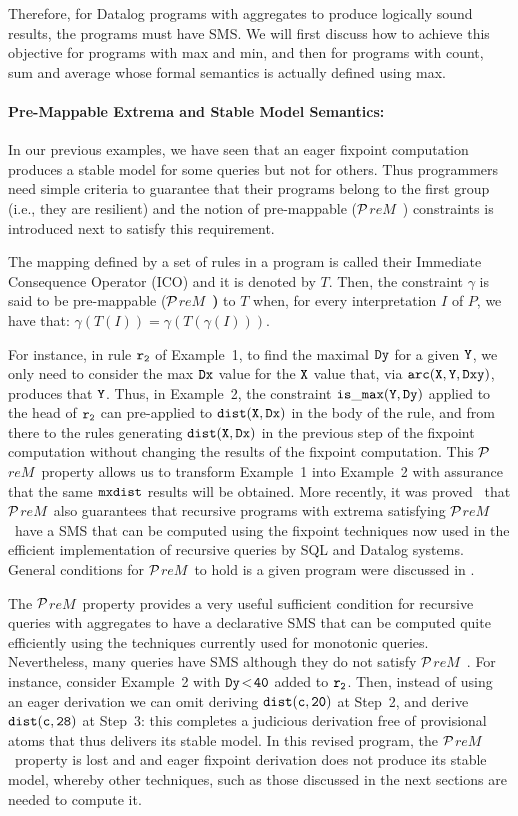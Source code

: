 \documentclass[11pt]{article}
\def\rof#1{$\tt r_{#1}$}
\def\prem{$\cal P$$\!reM$~}
\begin{document}
Therefore, for  Datalog programs with aggregates to produce  logically sound  results, the programs
must  have SMS. We  will  first discuss how  to achieve this objective for programs
with max and min,  and then for programs with count, sum and average whose formal semantics
is actually defined using max.

\paragraph{Pre-Mappable Extrema and Stable Model Semantics:}
In our previous examples, we have seen that an eager fixpoint computation produces 
a stable model for some queries but not for others.   Thus programmers need simple criteria to 
guarantee that their programs belong to the  first group (i.e., they are resilient) and  the notion of  pre-mappable   (\prem)  constraints 
\cite{DBLP:journals/tplp/ZanioloYDSCI17} is introduced next to satisfy this requirement. 

The mapping defined by a set of rules in a program is called their Immediate Consequence Operator (ICO) 
and it is  denoted by $T$.
Then, the constraint $\gamma$ is said to be pre-mappable ($\!$\prem{\bf)} to
 $T$  when, for every interpretation $I$ of
 $P$, we have that: $\gamma(T(I)) = \gamma (T(\gamma (I)))$.
 
 For instance,  in rule  \rof{2}  of Example~1,  to find  the
 maximal $\tt Dy$ for a given $\tt Y$, we only need to consider the max $\tt Dx$ value for the $\tt X$ value that,
 via  $\tt arc(X, Y, Dxy)$, produces that $\tt Y$.
  Thus, in Example~2, the constraint $\tt is\_max(Y, Dy)$ applied to
 the head of \rof{2} can pre-applied to $\tt  dist(X, Dx)$ in the body of the rule, and from there to 
 the rules generating  $\tt  dist(X, Dx)$ in the previous step of the fixpoint computation without changing 
 the results of the fixpoint computation. This \prem property  allows us to transform  Example~1 into Example~2
with assurance that the same $\tt mxdist$ results will be obtained.
More recently, it was proved~\cite{submitted} that \prem also guarantees that  recursive programs with extrema
satisfying \prem have a SMS that can be computed using the fixpoint techniques now used in the efficient implementation of
recursive queries by SQL and Datalog systems. 
General conditions for  \prem to hold is a given program were discussed in \cite{DBLP:conf/amw/ZanioloYIDSC18}.

The \prem property provides a very useful sufficient condition for
 recursive queries with aggregates to have a declarative SMS that can
 be computed quite efficiently using the techniques currently used 
 for monotonic queries.  Nevertheless, many queries  have SMS 
 although they do not satisfy \prem$\!\!.$
For instance,  consider Example~2 with  $\tt Dy \!<\!40$ added to \rof{2}. 
Then, instead of using an eager derivation we can omit  deriving  $\tt dist(c, 20)$
at Step~2, and derive $\tt dist(c, 28)$ at Step~3: this completes a judicious derivation
free of provisional atoms that thus delivers its stable model.  In this revised program, the \prem property is lost and and
 eager fixpoint derivation does not produce its stable model, whereby other techniques,
 such as those discussed in the next sections are needed to compute it.
\end{document}
